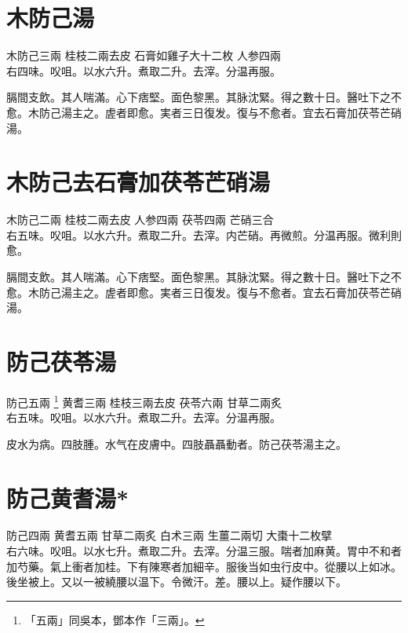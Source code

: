 \section{木防己湯}

木防己{\scriptsize 三兩} 桂枝{\scriptsize 二兩去皮} 石膏{\scriptsize 如雞子大十二枚} 人参{\scriptsize 四兩}\\
右四味。㕮咀。以水六升。煮取二升。去滓。分温再服。

膈間支飲。其人喘滿。心下痞堅。面色黎黑。其脉沈緊。得之數十日。醫吐下之不愈。木防己湯主之。虗者即愈。実者三日復发。復与不愈者。宜去石膏加茯苓芒硝湯。

\section{木防己去石膏加茯苓芒硝湯}

木防己{\scriptsize 二兩} 桂枝{\scriptsize 二兩去皮} 人参{\scriptsize 四兩} 茯苓{\scriptsize 四兩} 芒硝{\scriptsize 三合}\\
右五味。㕮咀。以水六升。煮取二升。去滓。内芒硝。再微煎。分温再服。微利則愈。

膈間支飲。其人喘滿。心下痞堅。面色黎黑。其脉沈緊。得之數十日。醫吐下之不愈。木防己湯主之。虗者即愈。実者三日復发。復与不愈者。宜去石膏加茯苓芒硝湯。

\section{防己茯苓湯}

防己{\scriptsize 五兩
	\footnote{
		「五兩」同吳本，鄧本作「三兩」。
	}
} 黄耆{\scriptsize 三兩} 桂枝{\scriptsize 三兩去皮} 茯苓{\scriptsize 六兩} 甘草{\scriptsize 二兩炙}\\
右五味。㕮咀。以水六升。煮取二升。去滓。分温再服。

皮水为病。四肢腫。水气在皮膚中。四肢聶聶動者。防己茯苓湯主之。

\section{防己黄耆湯*}

防己{\scriptsize 四兩} 黄耆{\scriptsize 五兩} 甘草{\scriptsize 二兩炙} 白术{\scriptsize 三兩} 生薑{\scriptsize 二兩切} 大棗{\scriptsize 十二枚擘}\\
右六味。㕮咀。以水七升。煮取二升。去滓。分温三服。喘者加麻黄。胃中不和者加芍藥。氣上衝者加桂。下有陳寒者加細辛。服後当如虫行皮中。從腰以上如冰。後坐被上。又以一被繞腰以温下。令微汗。差。{\scriptsize 腰以上。疑作腰以下。}

